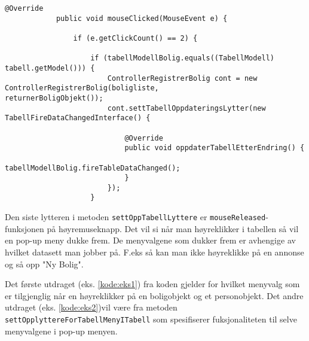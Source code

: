 \begin{lstlisting}[caption=Hendelse ved dobbelklikking på et objekt i tabellen]
			@Override
            public void mouseClicked(MouseEvent e) {

                if (e.getClickCount() == 2) {

                    if (tabellModellBolig.equals((TabellModell) tabell.getModel())) {
                        ControllerRegistrerBolig cont = new ControllerRegistrerBolig(boligliste, 				 returnerBoligObjekt());
                        cont.settTabellOppdateringsLytter(new TabellFireDataChangedInterface() {

                            @Override
                            public void oppdaterTabellEtterEndring() {
                                tabellModellBolig.fireTableDataChanged();
                            }
                        });
                    }
\end{lstlisting}


Den siste lytteren i metoden \texttt{settOppTabellLyttere} er \texttt{mouseReleased}-funksjonen på høyremuseknapp.
Det vil si når man høyreklikker i tabellen så vil en pop-up meny dukke frem. De menyvalgene som dukker frem er avhengige av hvilket datasett man jobber på. F.eks så kan man ikke høyreklikke på en annonse og så opp "Ny Bolig".

Det første utdraget (eks. \ref{kode:eks1}) fra koden gjelder for hvilket menyvalg som er tilgjenglig når en høyreklikker på en boligobjekt og et personobjekt. 
Det andre utdraget (eks. \ref{kode:eks2})vil være fra metoden \texttt{settOpplyttereForTabellMenyITabell} som spesifiserer fuksjonaliteten til selve menyvalgene i pop-up menyen.


